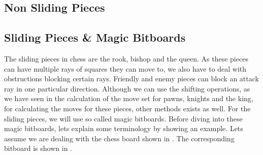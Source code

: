 \subsection{Non Sliding Pieces}




\subsection{Sliding Pieces \& Magic Bitboards}
The sliding pieces in chess are the rook, bishop and the queen.
As these pieces can have multiple rays of squares they can move to, we also have to deal with obstructions blocking certain rays.
Friendly and enemy pieces can block an attack ray in one particular direction.
Although we can use the shifting operations, as we have seen in the calculation of the move set for pawns, knights and the king, for calculating the moves for these pieces, other methods exists as well.
For the sliding pieces, we will use so called magic bitboards.
Before diving into these magic bitboards, lets explain some terminology by showing an example.
Lets assume we are dealing with the chess board shown in .
The corresponding bitboard is shown in .
%
